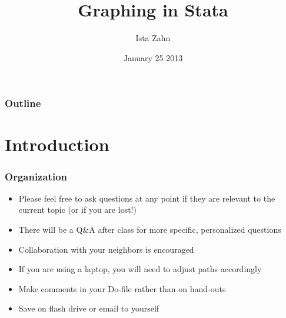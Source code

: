 \documentclass[table]{beamer}
\institute{Harvard MIT Data Center}
\title{Graphing in Stata}
\author{Ista Zahn}
\date{January 25 2013}
\begin{document}
\maketitle

\begin{frame}
\frametitle{Outline}
\setcounter{tocdepth}{3}
\tableofcontents
\end{frame}







\section{Introduction}
\label{sec-1}

\begin{frame}
\frametitle{Organization}
\label{sec-1-1}

\begin{itemize}
\item Please feel free to ask questions at any point if they are relevant to the current topic (or if you are lost!)
\item There will be a Q\&A after class for more specific, personalized questions
\item Collaboration with your neighbors is encouraged
\item If you are using a laptop, you will need to adjust paths accordingly
\item Make comments in your Do-file rather than on hand-outs
\item Save on flash drive or email to yourself
\end{itemize}
\end{frame}
\end{document}

